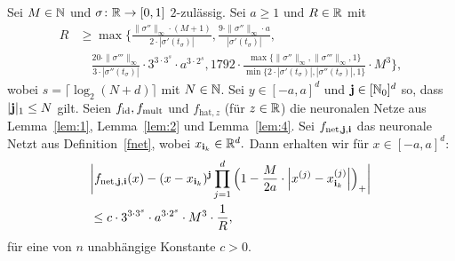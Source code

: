 \begin{lem}
\label{lem:5}
Sei $M \in \mathbb{N}$ und $\sigma\colon \mathbb{R} \to [0, 1]$ $2$-zulässig.
Sei $a \geq 1$ und $R \in \mathbb{R}$ mit
\begin{equation*}
\begin{split}
R & \geq \max\biggl\{\frac{\|\sigma''\|_{\infty} \cdot (M + 1)}{2 \cdot |\sigma'(t_{\sigma})|}, \frac{9 \cdot \|\sigma''\|_{\infty} \cdot a}{|\sigma'(t_{\sigma})|}, \\
& \quad \frac{20 \cdot \|\sigma'''\|_{\infty}}{3 \cdot |\sigma''(t_{\sigma})|} \cdot 3^{3 \cdot 3^s} \cdot a^{3 \cdot 2^s}, 1792 \cdot \frac{\max\{\|\sigma''\|_{\infty},\|\sigma'''\|_{\infty}, 1\}}{\min\{2 \cdot |\sigma'(t_{\sigma})|, |\sigma''(t_{\sigma})|, 1\}} \cdot M^3 \biggr\},
\end{split}
\end{equation*}
wobei $s = \lceil\log_2(N + d)\rceil$ mit $N \in \mathbb{N}$. Sei $y \in [-a, a]^d$ und $\mathbf{j} \in [\mathbb{N}_0]^d$ so, dass $|\mathbf{j}|_1 \leq N$ gilt. Seien $f_{\mathrm{id}}, f_{\mathrm{mult}}$ und $f_{\mathrm{hat}, z}$ (für $z \in \mathbb{R}$) die neuronalen Netze aus Lemma~\ref{lem:1}, Lemma~\ref{lem:2} und Lemma~\ref{lem:4}. Sei $f_{\mathrm{net},\mathbf{j},\mathbf{i}}$ das neuronale Netzt aus Definition~\ref{fnet}, wobei $x_{{\mathbf{i}}_k} \in \mathbb{R}^d.$
Dann erhalten wir für $x \in [-a, a]^d$:
\begin{equation*}
\begin{split}
& \bigg|f_{\mathrm{net},\mathbf{j},\mathbf{i}}(x) - (x - x_{\mathbf{i}_k})^{\mathbf{j}} \prod_{j = 1}^d \Big(1 - \frac{M}{2a} \cdot \Big|x^{(j)} - x_{\mathbf{i}_k}^{(j)}\Big|\Big)_+\bigg| \\
& \leq c \cdot 3^{3 \cdot 3^s} \cdot a^{3 \cdot 2^s} \cdot M^3 \cdot \frac{1}{R},
\end{split}
\end{equation*}
für eine von $n$ unabhängige Konstante $c > 0$.
\end{lem} 
 
